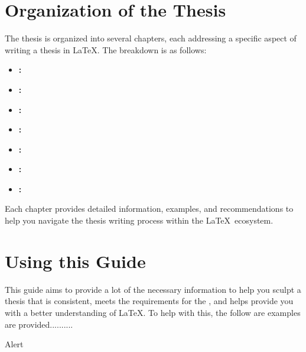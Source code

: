 	\section{Organization of the Thesis}
		The thesis is organized into several chapters, each addressing a specific aspect of writing a thesis in \LaTeX. 
		The breakdown is as follows:
		\begin{itemize}
			\item \textbf{:}  
			\item \textbf{:}  
			\item \textbf{:}  
			\item \textbf{:}  
			\item \textbf{:}  
			\item \textbf{:}  
			\item \textbf{:}  
		\end{itemize}

		Each chapter provides detailed information, examples, and recommendations to help you navigate the thesis writing process within the \LaTeX\ ecosystem.

	\section{Using this Guide}
		This guide aims to provide a lot of the necessary information to help you sculpt a thesis that is consistent, meets the requirements for the \University, and helps provide you with a better understanding of \LaTeX.
		To help with this, the follow are examples are provided..........
		

		\alert{Alert}











